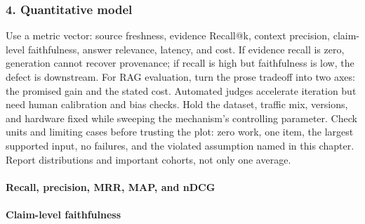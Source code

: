 \subsubsection*{4. Quantitative model}
Use a metric vector: source freshness, evidence Recall@k, context precision, claim-level faithfulness, answer relevance, latency, and cost. If evidence recall is zero, generation cannot recover provenance; if recall is high but faithfulness is low, the defect is downstream.
For RAG evaluation, turn the prose tradeoff into two axes: the promised gain and the stated cost. Automated judges accelerate iteration but need human calibration and bias checks. Hold the dataset, traffic mix, versions, and hardware fixed while sweeping the mechanism's controlling parameter.
Check units and limiting cases before trusting the plot: zero work, one item, the largest supported input, no failures, and the violated assumption named in this chapter. Report distributions and important cohorts, not only one average.
\paragraph{Recall, precision, MRR, MAP, and nDCG}
\paragraph{Claim-level faithfulness}
